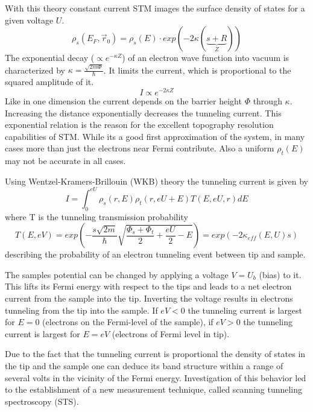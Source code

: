 With this theory constant current STM images the surface density of states for  a given voltage $U$. 
$$\rho_s(E_F,\vec r_0)= \rho_s(E) \cdot exp(-2\kappa (\underbrace{s+R}_{Z}))$$
The exponential decay ($\propto e^{-\kappa Z}$) of an electron wave function into vacuum is characterized by $\kappa=\frac{\sqrt{2m\Phi}}{\hbar}$. It limits the current, which is proportional to the squared amplitude of it. 
$$I\propto e^{-2\kappa Z}$$
Like in one dimension the current depends on the barrier height $\Phi$ through $\kappa$. Increasing the distance exponentially decreases the tunneling current.
This exponential relation is the reason for the excellent topography resolution capabilities of STM. While its a good first approximation of the system, in many cases more than just the electrons near Fermi contribute. Also a uniform $\rho_t(E)$ may not be accurate in all cases.

Using  Wentzel-Kramers-Brillouin (WKB) theory\cite{wentzel_verallgemeinerung_1926, kramers_wellenmechanik_1926, brillouin_mecanique_1926} the tunneling current is given by
\begin{equation}
I=\int_0^{eU}\rho_s(r,E)\rho_t(r,eU+E)T(E,eU,r)dE
\label{WKB}
\end{equation}
where %
T is the tunneling transmission probability
\begin{equation}
T(E,eV)=exp\left(-\frac{s\sqrt{2m}}{\hbar}\sqrt{\frac{\Phi_s+\Phi_t}{2}+\frac{eU}{2}-E}\right)=exp\left(-2\kappa_{eff}(E,U)s\right)
\label{Transmission-function} 
\end{equation}
describing the probability of an electron tunneling event between tip and sample.

The samples potential can be changed by applying a voltage $V=U_b$ (bias) to it. This lifts its Fermi energy with respect to the tips and leads to a net electron current from the sample into the tip. Inverting the voltage results in electrons tunneling from the tip into the sample. If $eV<0$ the tunneling current is largest for $E=0$ (electrons on the Fermi-level of the sample), if $eV>0$ the tunneling current is largest for $E=eV$ (electrons of Fermi level in tip).

Due to the fact that the tunneling current is proportional the density of states in the tip and the sample one can deduce its band structure within a range of several volts in the vicinity of the Fermi energy. Investigation of this behavior led to the establishment of a new measurement technique, called scanning tunneling spectroscopy (STS).

